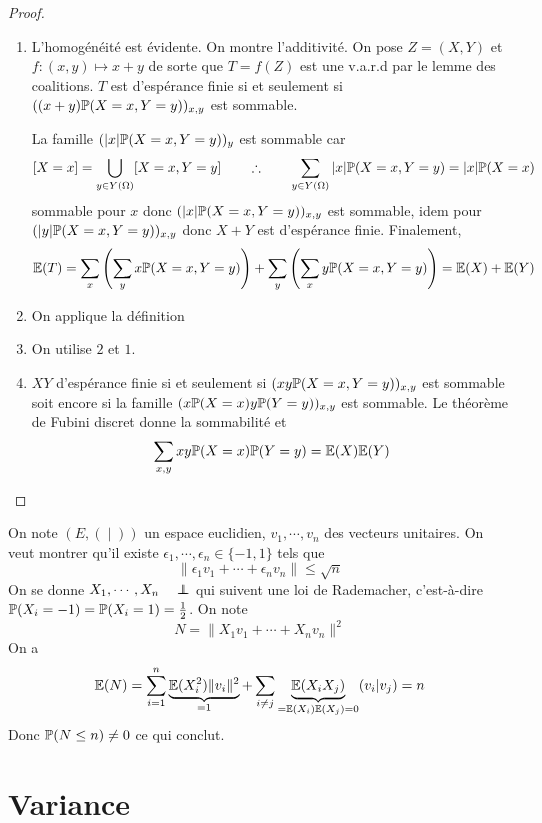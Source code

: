 \begin{proof}~
\begin{enumerate}
    \item L'homogénéité est évidente. On montre l'additivité. On pose $Z=(X,Y)$ et  $f:(x,y)\longmapsto x+y$ de sorte que $T=f(Z)$ est une v.a.r.d par le lemme des coalitions.  $T$ est d'espérance finie  si et seulement si $((x+y)\P(X=x,Y=y))_{x,y}$ est sommable.

        La famille $(|x|\P(X=x,Y=y))_{y}$ est sommable car \[
            [X=x]=\bigcup_{y \in  Y(\Omega)} [X=x,Y=y] \qquad \therefore \qquad  \sum_{y \in  Y(\Omega)}|x|\P(X=x,Y=y)=|x|\P(X=x)
        \]
        sommable pour $x$ donc $(|x|\P(X=x,Y=y))_{x,y}$ est sommable, idem pour $(|y|\P(X=x,Y=y))_{x,y}$ donc $X+Y$ est d'espérance finie. Finalement,  \[
            \E(T)=\sum_x \left( \sum_y x\P(X=x,Y=y) \right) +\sum_y \left( \sum_x y\P(X=x,Y=y) \right) =\E(X)+\E(Y)
        \] 
    \item On applique la définition
    \item On utilise $2$ et $1$.
    \item $XY$ d'espérance finie  si et seulement si $(xy\P(X=x,Y=y))_{x,y}$ est sommable soit encore si la famille  $(x\P(X=x)y\P(Y=y))_{x,y}$ est sommable. Le théorème de Fubini discret donne la sommabilité et \[
            \sum_{x,y}xy\P(X=x)\P(Y=y)=\E(X)\E(Y)
    \]
\end{enumerate}
\end{proof}

\begin{ex}
    On note $(E, (\;|\;))$ un espace euclidien,  $v_1,\cdots ,v_n$ des vecteurs unitaires. On veut montrer qu'il existe $\epsilon_1,\cdots ,\epsilon_n\in \{-1,1\} $ tels que \[
        \|\epsilon_1v_1+\cdots +\epsilon_nv_n\|\leq \sqrt{n}
    \] 
    On se donne $X_1,\cdots ,X_n \quad  \indep$ qui suivent une loi de Rademacher, c'est-à-dire $\P(X_i=-1)=\P(X_i=1)=\frac{1}{2}$. On note \[
        N=\|X_1v_1+\cdots +X_nv_n\|^2
    \] 
    On a \[
        \E(N)=\sum_{i=1}^n\underbrace{\E(X_i^2)\|v_i\|^2}_{=1}+\sum_{i\neq  j}\underbrace{\E(X_iX_j)}_{=\E(X_i)\E(X_j)=0}(v_i|v_j)=n
    \]
    Donc $\P(N\leq n)\neq 0$ ce qui conclut.
\end{ex}

\section{Variance}

